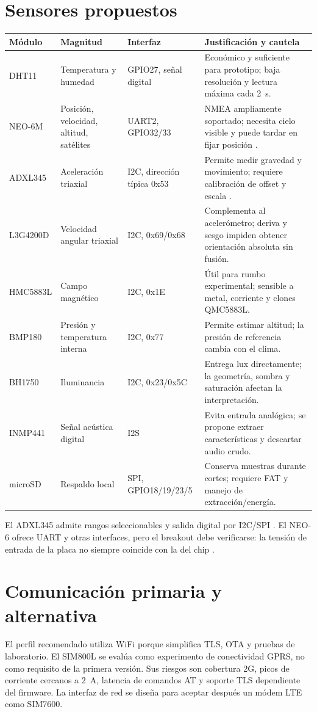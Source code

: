 \documentclass[11pt,a4paper,oneside]{report}
\begin{document}
\section{Sensores propuestos}
\begin{longtable}{p{3.2cm}p{3.3cm}p{3.4cm}p{4.2cm}}
\toprule
\textbf{Módulo} & \textbf{Magnitud} & \textbf{Interfaz} & \textbf{Justificación y cautela}\\
\midrule
\endhead
DHT11 & Temperatura y humedad & GPIO27, señal digital & Económico y suficiente para prototipo; baja resolución y lectura máxima cada 2~s.\\
NEO-6M & Posición, velocidad, altitud, satélites & UART2, GPIO32/33 & NMEA ampliamente soportado; necesita cielo visible y puede tardar en fijar posición \cite{neo6}.\\
ADXL345 & Aceleración triaxial & I2C, dirección típica 0x53 & Permite medir gravedad y movimiento; requiere calibración de offset y escala \cite{adxl}.\\
L3G4200D & Velocidad angular triaxial & I2C, 0x69/0x68 & Complementa al acelerómetro; deriva y sesgo impiden obtener orientación absoluta sin fusión.\\
HMC5883L & Campo magnético & I2C, 0x1E & Útil para rumbo experimental; sensible a metal, corriente y clones QMC5883L.\\
BMP180 & Presión y temperatura interna & I2C, 0x77 & Permite estimar altitud; la presión de referencia cambia con el clima.\\
BH1750 & Iluminancia & I2C, 0x23/0x5C & Entrega lux directamente; la geometría, sombra y saturación afectan la interpretación.\\
INMP441 & Señal acústica digital & I2S & Evita entrada analógica; se propone extraer características y descartar audio crudo.\\
microSD & Respaldo local & SPI, GPIO18/19/23/5 & Conserva muestras durante cortes; requiere FAT y manejo de extracción/energía.\\
\bottomrule
\end{longtable}

El ADXL345 admite rangos seleccionables y salida digital por I2C/SPI
\cite{adxl}. El NEO-6 ofrece UART y otras interfaces, pero el breakout debe verificarse:
la tensión de entrada de la placa no siempre coincide con la del chip \cite{neo6}.

\section{Comunicación primaria y alternativa}
El perfil recomendado utiliza WiFi porque simplifica TLS, OTA y pruebas de laboratorio.
El SIM800L se evalúa como experimento de conectividad GPRS, no como requisito de la
primera versión. Sus riesgos son cobertura 2G, picos de corriente cercanos a 2~A,
latencia de comandos AT y soporte TLS dependiente del firmware. La interfaz de red se
diseña para aceptar después un módem LTE como SIM7600.
\end{document}
